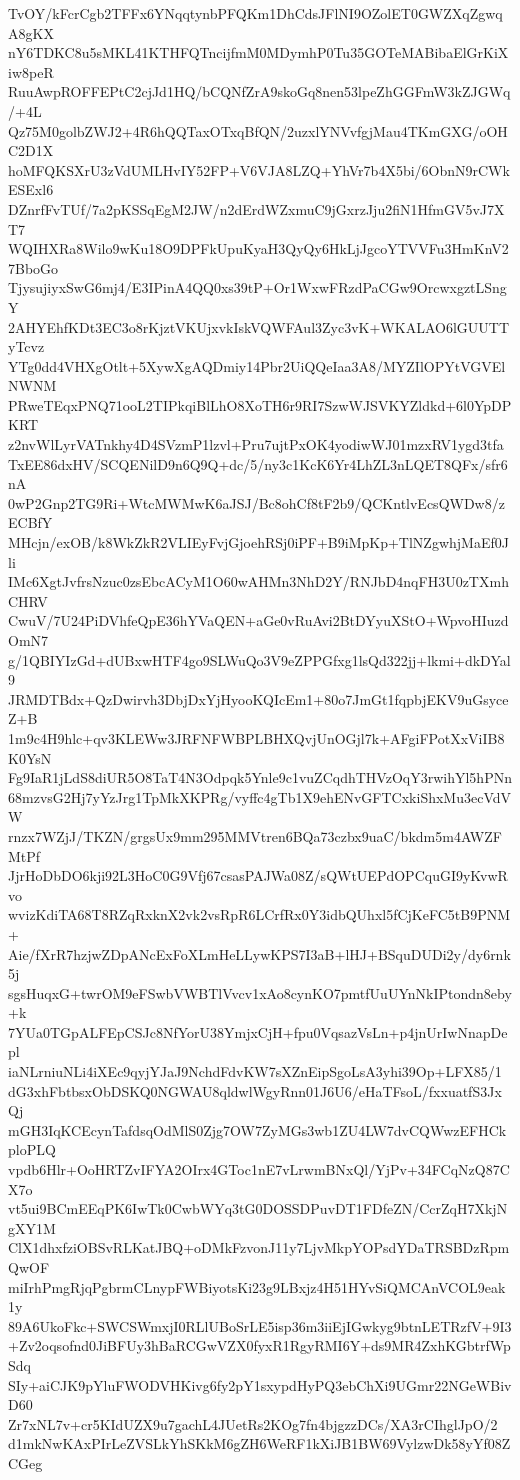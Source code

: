 TvOY/kFcrCgb2TFFx6YNqqtynbPFQKm1DhCdsJFlNI9OZolET0GWZXqZgwqA8gKX
nY6TDKC8u5sMKL41KTHFQTncijfmM0MDymhP0Tu35GOTeMABibaElGrKiXiw8peR
RuuAwpROFFEPtC2cjJd1HQ/bCQNfZrA9skoGq8nen53lpeZhGGFmW3kZJGWq/+4L
Qz75M0golbZWJ2+4R6hQQTaxOTxqBfQN/2uzxlYNVvfgjMau4TKmGXG/oOHC2D1X
hoMFQKSXrU3zVdUMLHvIY52FP+V6VJA8LZQ+YhVr7b4X5bi/6ObnN9rCWkESExl6
DZnrfFvTUf/7a2pKSSqEgM2JW/n2dErdWZxmuC9jGxrzJju2fiN1HfmGV5vJ7XT7
WQIHXRa8Wilo9wKu18O9DPFkUpuKyaH3QyQy6HkLjJgcoYTVVFu3HmKnV27BboGo
TjysujiyxSwG6mj4/E3IPinA4QQ0xs39tP+Or1WxwFRzdPaCGw9OrcwxgztLSngY
2AHYEhfKDt3EC3o8rKjztVKUjxvkIskVQWFAul3Zyc3vK+WKALAO6lGUUTTyTcvz
YTg0dd4VHXgOtlt+5XywXgAQDmiy14Pbr2UiQQeIaa3A8/MYZIlOPYtVGVElNWNM
PRweTEqxPNQ71ooL2TIPkqiBlLhO8XoTH6r9RI7SzwWJSVKYZldkd+6l0YpDPKRT
z2nvWlLyrVATnkhy4D4SVzmP1lzvl+Pru7ujtPxOK4yodiwWJ01mzxRV1ygd3tfa
TxEE86dxHV/SCQENilD9n6Q9Q+dc/5/ny3c1KcK6Yr4LhZL3nLQET8QFx/sfr6nA
0wP2Gnp2TG9Ri+WtcMWMwK6aJSJ/Bc8ohCf8tF2b9/QCKntlvEcsQWDw8/zECBfY
MHcjn/exOB/k8WkZkR2VLIEyFvjGjoehRSj0iPF+B9iMpKp+TlNZgwhjMaEf0Jli
IMc6XgtJvfrsNzuc0zsEbcACyM1O60wAHMn3NhD2Y/RNJbD4nqFH3U0zTXmhCHRV
CwuV/7U24PiDVhfeQpE36hYVaQEN+aGe0vRuAvi2BtDYyuXStO+WpvoHIuzdOmN7
g/1QBIYIzGd+dUBxwHTF4go9SLWuQo3V9eZPPGfxg1lsQd322jj+lkmi+dkDYal9
JRMDTBdx+QzDwirvh3DbjDxYjHyooKQIcEm1+80o7JmGt1fqpbjEKV9uGsyceZ+B
1m9c4H9hlc+qv3KLEWw3JRFNFWBPLBHXQvjUnOGjl7k+AFgiFPotXxViIB8K0YsN
Fg9IaR1jLdS8diUR5O8TaT4N3Odpqk5Ynle9c1vuZCqdhTHVzOqY3rwihYl5hPNn
68mzvsG2Hj7yYzJrg1TpMkXKPRg/vyffc4gTb1X9ehENvGFTCxkiShxMu3ecVdVW
rnzx7WZjJ/TKZN/grgsUx9mm295MMVtren6BQa73czbx9uaC/bkdm5m4AWZFMtPf
JjrHoDbDO6kji92L3HoC0G9Vfj67csasPAJWa08Z/sQWtUEPdOPCquGI9yKvwRvo
wvizKdiTA68T8RZqRxknX2vk2vsRpR6LCrfRx0Y3idbQUhxl5fCjKeFC5tB9PNM+
Aie/fXrR7hzjwZDpANcExFoXLmHeLLywKPS7I3aB+lHJ+BSquDUDi2y/dy6rnk5j
sgsHuqxG+twrOM9eFSwbVWBTlVvcv1xAo8cynKO7pmtfUuUYnNkIPtondn8eby+k
7YUa0TGpALFEpCSJc8NfYorU38YmjxCjH+fpu0VqsazVsLn+p4jnUrIwNnapDepl
iaNLrniuNLi4iXEc9qyjYJaJ9NchdFdvKW7sXZnEipSgoLsA3yhi39Op+LFX85/1
dG3xhFbtbsxObDSKQ0NGWAU8qldwlWgyRnn01J6U6/eHaTFsoL/fxxuatfS3JxQj
mGH3IqKCEcynTafdsqOdMlS0Zjg7OW7ZyMGs3wb1ZU4LW7dvCQWwzEFHCkploPLQ
vpdb6Hlr+OoHRTZvIFYA2OIrx4GToc1nE7vLrwmBNxQl/YjPv+34FCqNzQ87CX7o
vt5ui9BCmEEqPK6IwTk0CwbWYq3tG0DOSSDPuvDT1FDfeZN/CcrZqH7XkjNgXY1M
ClX1dhxfziOBSvRLKatJBQ+oDMkFzvonJ11y7LjvMkpYOPsdYDaTRSBDzRpmQwOF
miIrhPmgRjqPgbrmCLnypFWBiyotsKi23g9LBxjz4H51HYvSiQMCAnVCOL9eak1y
89A6UkoFkc+SWCSWmxjI0RLlUBoSrLE5isp36m3iiEjIGwkyg9btnLETRzfV+9I3
+Zv2oqsofnd0JiBFUy3hBaRCGwVZX0fyxR1RgyRMI6Y+ds9MR4ZxhKGbtrfWpSdq
SIy+aiCJK9pYluFWODVHKivg6fy2pY1sxypdHyPQ3ebChXi9UGmr22NGeWBivD60
Zr7xNL7v+cr5KIdUZX9u7gachL4JUetRs2KOg7fn4bjgzzDCs/XA3rCIhglJpO/2
d1mkNwKAxPIrLeZVSLkYhSKkM6gZH6WeRF1kXiJB1BW69VylzwDk58yYf08ZCGeg
